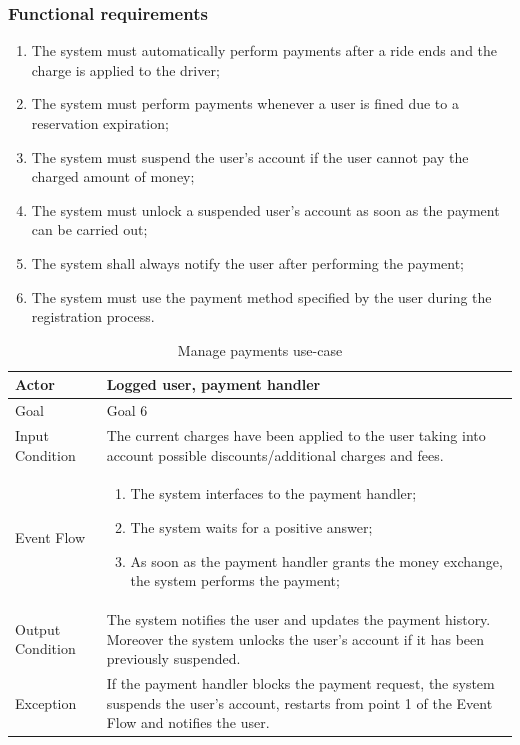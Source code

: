 \subsubsection{Functional requirements}
\begin{enumerate}
\item The system must automatically perform payments after a ride ends and the charge is applied to the driver;
\item The system must perform payments whenever a user is fined due to a reservation expiration;
\item The system must suspend the user's account if the user cannot pay the charged amount of money;
\item The system must unlock a suspended user's account as soon as the payment can be carried out;
\item The system shall always notify the user after performing the payment;
\item The system must use the payment method specified by the user during the registration process.
\end{enumerate}

\begin{table}[H]
\begin{center}
\begin{tabular}{p{} | p{}}
\hline
Actor & Logged user, payment handler\\
\hline
Goal & Goal 6\\
\hline
Input Condition & The current charges have been applied to the user taking into account possible discounts/additional charges and fees.\\
\hline
Event Flow & 
\begin{enumerate}
\item The system interfaces to the payment handler;
\item The system waits for a positive answer;
\item As soon as the payment handler grants the money exchange, the system performs the payment;
\end{enumerate} \\
\hline
Output Condition & The system notifies the user and updates the payment history. Moreover the system unlocks the user's account if it has been previously suspended.\\
\hline
Exception & If the payment handler blocks the payment request, the system suspends the user's account, restarts from point 1 of the Event Flow and notifies the user.\\
\hline
\end{tabular}
\end{center}
\caption{Manage payments use-case}
\label{manage_payments_uc}
\end{table}

